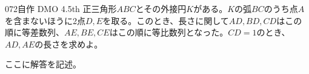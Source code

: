 \begin{prob}{072}{}{自作 DMO 4.5th}
 正三角形$ABC$とその外接円$K$がある。$K$の弧$BC$のうち点$A$を含まないほうに2点$D, E$を取る。このとき、長さに関して$AD, BD, CD$はこの順に等差数列、$AE, BE, CE$はこの順に等比数列となった。$CD=1$のとき、$AD, AE$の長さを求めよ。
\end{prob}
ここに解答を記述。